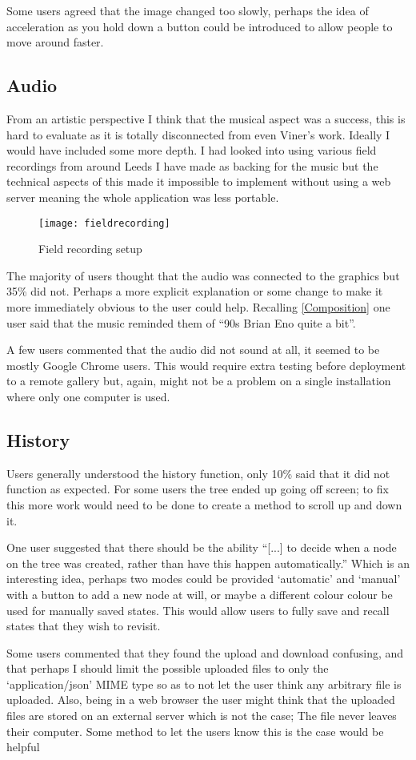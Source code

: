Some users agreed that the image changed too slowly, perhaps the idea of
acceleration as you hold down a button could be introduced to allow people to
move around faster.

\subsection{Audio}
From an artistic perspective I think that the musical aspect was a success, this
is hard to evaluate as it is totally disconnected from even Viner's work.
Ideally I would have included some more depth. I had looked into using various
field recordings from around Leeds I have made as backing for the music but the
technical aspects of this made it impossible to implement without using a
web server meaning the whole application was less portable.

\begin{figure}[H]
    \centering
    \texttt{[image: fieldrecording]}
    \caption{Field recording setup}
\end{figure}

The majority of users thought that the audio was connected to the graphics but
35\% did not. Perhaps a more explicit explanation or some change to make it more
immediately obvious to the user could help. Recalling \autoref{Composition} one
user said that the music reminded them of ``90s Brian Eno quite a bit''.

A few users commented that the audio did not sound at all, it seemed to be
mostly Google Chrome users. This would require extra testing before deployment
to a remote gallery but, again, might not be a problem on a single installation
where only one computer is used.

\subsection{History}
Users generally understood the history function, only 10\% said that it did not
function as expected. For some users the tree ended up going off screen; to fix
this more work would need to be done to create a method to scroll up and down
it.

One user suggested that there should be the ability ``[...] to decide when a
node on the tree was created, rather than have this happen automatically.''
Which is an interesting idea, perhaps two modes could be provided `automatic'
and `manual' with a button to add a new node at will, or maybe a different
colour colour be used for manually saved states. This would allow users to fully
save and recall states that they wish to revisit.

Some users commented that they found the upload and download confusing, and that
perhaps I should limit the possible uploaded files to only the
`application/json' MIME type so as to not let the user think any arbitrary file
is uploaded. Also, being in a web browser the user might think that the
uploaded files are stored on an external server which is not the case; The file
never leaves their computer. Some method to let the users know this is the case
would be helpful
